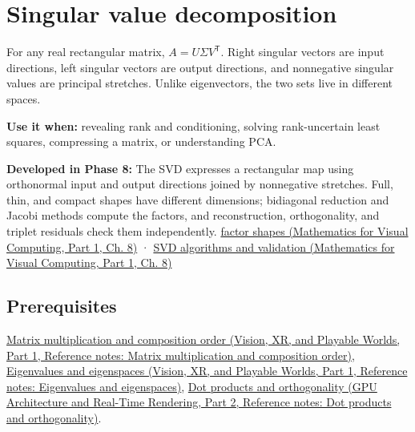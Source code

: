 \hypertarget{appendix-1fad5e7f36fa}{}\label{referencestart:appendix-1fad5e7f36fa}
\section{Singular value decomposition}\label{appendix-1fad5e7f36fa-singular-value-decomposition}

\hypertarget{appendix-1fad5e7f36fa-singular-value-decomposition}{}

For any real rectangular matrix, \(A=U\Sigma V^\mathsf T\). Right singular vectors are input directions, left singular vectors are output directions, and nonnegative singular values are principal stretches. Unlike eigenvectors, the two sets live in different spaces.

\textbf{Use it when:} revealing rank and conditioning, solving rank-uncertain least squares, compressing a matrix, or understanding PCA.

\textbf{Developed in Phase 8:} The SVD expresses a rectangular map using orthonormal input and output directions joined by nonnegative stretches. Full, thin, and compact shapes have different dimensions; bidiagonal reduction and Jacobi methods compute the factors, and reconstruction, orthogonality, and triplet residuals check them independently. \href{../02-Mathematics-for-Visual-Computing-P01/main.pdf\#02-foundations-ii-ch024-full-thin-and-compact-shapes-for-tall-and-wide-matrices}{factor shapes (Mathematics for Visual Computing, Part 1, Ch. 8)} · \href{../02-Mathematics-for-Visual-Computing-P01/main.pdf\#02-foundations-ii-ch024-how-numerical-software-computes-and-checks-an-svd}{SVD algorithms and validation (Mathematics for Visual Computing, Part 1, Ch. 8)}

\subsection{Prerequisites}\label{appendix-1fad5e7f36fa-prerequisites}

\hypertarget{appendix-1fad5e7f36fa-prerequisites}{}

\href{../07-Vision-XR-and-Playable-Worlds-P01/main.pdf\#appendix-ab31ef447dbf}{Matrix multiplication and composition order (Vision, XR, and Playable Worlds, Part 1, Reference notes: Matrix multiplication and composition order)}, \href{../07-Vision-XR-and-Playable-Worlds-P01/main.pdf\#appendix-0b3be18411f9}{Eigenvalues and eigenspaces (Vision, XR, and Playable Worlds, Part 1, Reference notes: Eigenvalues and eigenspaces)}, \href{../06-GPU-Architecture-and-Real-Time-Rendering-P02/main.pdf\#appendix-8bc4e8fc547c}{Dot products and orthogonality (GPU Architecture and Real-Time Rendering, Part 2, Reference notes: Dot products and orthogonality)}.

